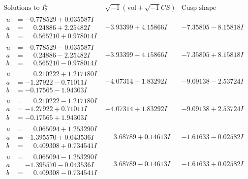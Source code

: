 \documentclass[1p]{elsarticle_modified}
\theoremstyle{definition}
\newcommand{\I}{\sqrt{-1}}
\begin{document}
$$\begin{array}{c|c|c}  
\text{Solutions to }I^u_{2}& \I (\text{vol} + \sqrt{-1}CS) & \text{Cusp shape}\\
 \hline 
\begin{aligned}
u &= -0.778529 + 0.035587 I \\
a &= \phantom{-}0.24886 + 2.25482 I \\
b &= \phantom{-}0.565210 + 0.978014 I\end{aligned}
 & -3.93399 + 4.15866 I & -7.35805 - 8.15818 I \\ \hline\begin{aligned}
u &= -0.778529 - 0.035587 I \\
a &= \phantom{-}0.24886 - 2.25482 I \\
b &= \phantom{-}0.565210 - 0.978014 I\end{aligned}
 & -3.93399 - 4.15866 I & -7.35805 + 8.15818 I \\ \hline\begin{aligned}
u &= \phantom{-}0.210222 + 1.217180 I \\
a &= -1.27922 - 0.71011 I \\
b &= -0.17565 - 1.94303 I\end{aligned}
 & -4.07314 - 1.83292 I & -9.09138 - 2.53724 I \\ \hline\begin{aligned}
u &= \phantom{-}0.210222 - 1.217180 I \\
a &= -1.27922 + 0.71011 I \\
b &= -0.17565 + 1.94303 I\end{aligned}
 & -4.07314 + 1.83292 I & -9.09138 + 2.53724 I \\ \hline\begin{aligned}
u &= \phantom{-}0.065094 + 1.253290 I \\
a &= -1.395570 + 0.043536 I \\
b &= \phantom{-}0.409308 + 0.734541 I\end{aligned}
 & \phantom{-}3.68789 + 0.14613 I & -1.61633 - 0.02582 I \\ \hline\begin{aligned}
u &= \phantom{-}0.065094 - 1.253290 I \\
a &= -1.395570 - 0.043536 I \\
b &= \phantom{-}0.409308 - 0.734541 I\end{aligned}
 & \phantom{-}3.68789 - 0.14613 I & -1.61633 + 0.02582 I \\ \hline\begin{aligned}

\end{aligned}
\end{array}$$
\end{document}

